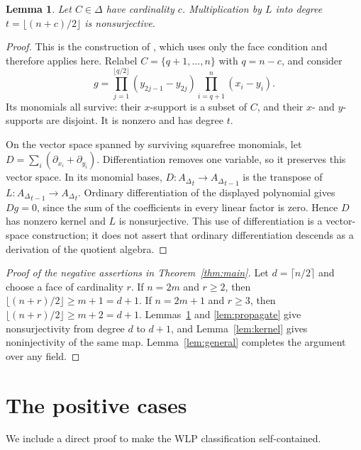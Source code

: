\documentclass[11pt]{article}
\newtheorem{lemma}[theorem]{Lemma}
\theoremstyle{remark}
\newcommand{\A}{{A_{\Delta}}}
\begin{document}
\begin{lemma}\label{lem:cokernel}
Let $C\in\Delta$ have cardinality $c$. Multiplication by $L$ into degree $t=\lfloor(n+c)/2\rfloor$ is nonsurjective.
\end{lemma}
\begin{proof}
This is the construction of \cite[Theorem 3.10]{HN}, which uses only the face condition and therefore applies here. Relabel $C=\{q+1,\ldots,n\}$ with $q=n-c$, and consider
\[
g=\prod_{j=1}^{\lfloor q/2\rfloor}(y_{2j-1}-y_{2j})
  \prod_{i=q+1}^n(x_i-y_i).
\]
Its monomials all survive: their $x$-support is a subset of $C$, and their $x$- and $y$-supports are disjoint. It is nonzero and has degree $t$.

On the vector space spanned by surviving squarefree monomials, let $D=\sum_i(\partial_{x_i}+\partial_{y_i})$. Differentiation removes one variable, so it preserves this vector space. In its monomial bases, $D:\A_t\to\A_{t-1}$ is the transpose of $L:\A_{t-1}\to\A_t$. Ordinary differentiation of the displayed polynomial gives $Dg=0$, since the sum of the coefficients in every linear factor is zero. Hence $D$ has nonzero kernel and $L$ is nonsurjective. This use of differentiation is a vector-space construction; it does not assert that ordinary differentiation descends as a derivation of the quotient algebra.
\end{proof}

\begin{proof}[Proof of the negative assertions in Theorem~\ref{thm:main}]
Let $d=\lceil n/2\rceil$ and choose a face of cardinality $r$. If $n=2m$ and $r\geq2$, then $\lfloor(n+r)/2\rfloor\geq m+1=d+1$. If $n=2m+1$ and $r\geq3$, then $\lfloor(n+r)/2\rfloor\geq m+2=d+1$. Lemmas~\ref{lem:cokernel} and \ref{lem:propagate} give nonsurjectivity from degree $d$ to $d+1$, and Lemma~\ref{lem:kernel} gives noninjectivity of the same map. Lemma~\ref{lem:general} completes the argument over any field.
\end{proof}

\section{The positive cases}
We include a direct proof to make the WLP classification self-contained.
\end{document}
